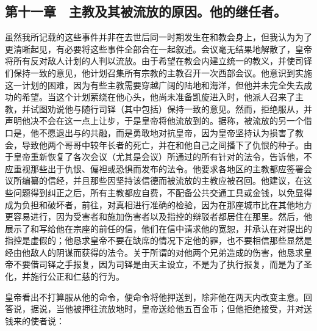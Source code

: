 
\subsection{第十一章　主教及其被流放的原因。他的继任者。}

虽然我所记载的这些事件并非在去世后同一时期发生在和教会身上，但我认为为了更清晰起见，有必要将这些事件全部合在一起叙述。会议毫无结果地解散了，皇帝将所有反对敌人计划的人判以流放。由于希望在教会内建立统一的教义，并使司铎们保持一致的意见，他计划召集所有宗教的主教召开一次西部会议。他意识到实施这一计划的困难，因为有些主教需要穿越广阔的陆地和海洋，但他并未完全失去成功的希望。当这个计划萦绕在他心头，他尚未准备凯旋进入时，他派人召来了主教，并试图劝说他与随行司铎（其中包括）保持一致的意见。然而，拒绝服从，并声明他决不会在这一点上让步，于是皇帝将他流放到的。据称，被流放的另一个借口是，他不愿退出与的共融，而是勇敢地对抗皇帝，因为皇帝坚持认为损害了教会，导致他两个哥哥中较年长者的死亡，并在和他自己之间播下了仇恨的种子。由于皇帝重新恢复了各次会议（尤其是会议）所通过的所有针对的法令，告诉他，不应重视那些出于仇恨、偏袒或恐惧而发布的法令。他要求各地区的主教都应签署会议所编纂的信经，并且那些因坚持该信德而被流放的主教应被召回。他建议，在这些问题得到纠正之后，所有主教都应自费，不配备公共交通工具或金钱，以免显得成为负担和破坏者，前往，对真相进行准确的检验，因为在那座城市比在其他地方更容易进行，因为受害者和施加伤害者以及指控的辩驳者都居住在那里。然后，他展示了和写给他在宗座的前任的信，他们在信中请求他的宽恕，并承认在对提出的指控是虚假的；他恳求皇帝不要在缺席的情况下定他的罪，也不要相信那些显然是经由他敌人的阴谋而获得的法令。关于所谓的对他两个兄弟造成的伤害，他恳求皇帝不要借司铎之手报复，因为司铎是由天主设立，不是为了执行报复，而是为了圣化，并施行公正和仁慈的行为。\par

皇帝看出不打算服从他的命令，便命令将他押送到，除非他在两天内改变主意。回答说，据说，当他被押往流放地时，皇帝送给他五百金币；但他拒绝接受，并对送钱来的使者说：\par

